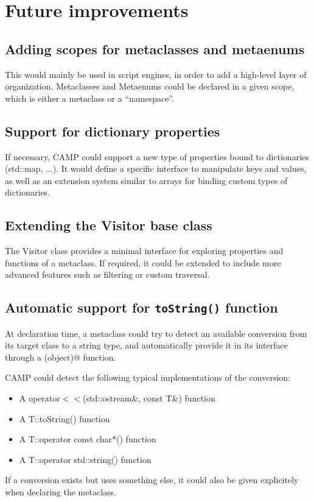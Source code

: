 \documentclass[a4paper, twoside]{report}
\begin{document}
\chapter{Future improvements}

\section{Adding scopes for metaclasses and metaenums}

	This would mainly be used in script engines, in order to add a high-level layer
	of organization. Metaclasses and Metaenums could be declared in a given scope,
	which is either a metaclass or a ``namespace''.

\section{Support for dictionary properties}

	If necessary, CAMP could support a new type of properties bound to
	dictionaries (std::map, ...). It would define a specific interface to
	manipulate keys and values, as well as an extension system similar to
	arrays for binding custom types of dictionaries.

\section{Extending the Visitor base class}

	The Visitor class provides a minimal interface for exploring properties and functions
	of a metaclass. If required, it could be extended to include more advanced features such
	as filtering or custom traversal.

\section{Automatic support for \texttt{toString()} function}

	At declaration time, a metaclass could try to detect an available conversion from its target class
	to a string type, and automatically provide it in its interface through a \verb@toString(object)@ function.
	
	CAMP could detect the following typical implementations of the conversion:
	\begin{itemize}
		\item A operator$<<$(std::ostream\&, const T\&) function
		\item A T::toString() function
		\item A T::operator const char*() function
		\item A T::operator std::string() function
	\end{itemize}
	
	If a conversion exists but uses something else, it could also be given explicitely when declaring the metaclass.

\listoffigures
\end{document}
